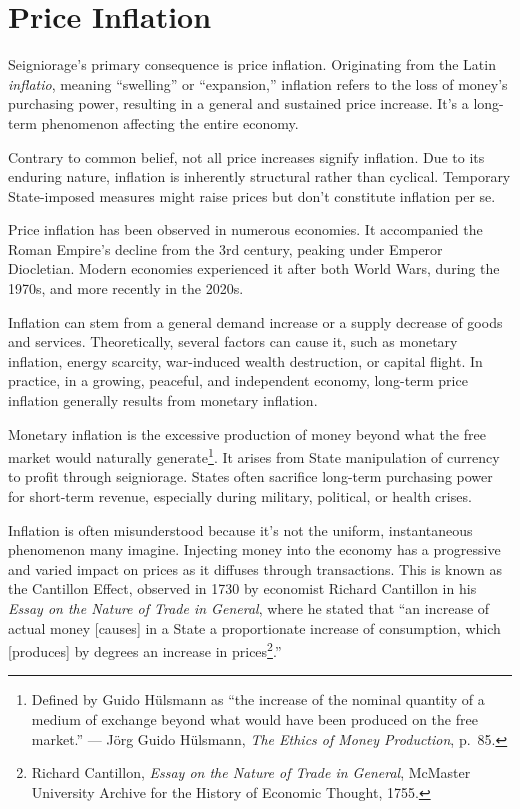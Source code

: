 \documentclass[
  a5paper,
  smalldemyvopaper,10pt,twoside,onecolumn,openright,extrafontsizes,hidelinks]{memoir}
\begin{document}
\section*{Price Inflation}\label{linflation-des-prix}


Seigniorage's primary consequence is price inflation. Originating from
the Latin \emph{inflatio}, meaning ``swelling'' or ``expansion,''
inflation refers to the loss of money's purchasing power, resulting in a
general and sustained price increase. It's a long-term phenomenon
affecting the entire economy.

Contrary to common belief, not all price increases signify inflation.
Due to its enduring nature, inflation is inherently structural rather
than cyclical. Temporary State-imposed measures might raise prices but
don't constitute inflation per se.

Price inflation has been observed in numerous economies. It accompanied
the Roman Empire's decline from the 3rd century, peaking under Emperor
Diocletian. Modern economies experienced it after both World Wars,
during the 1970s, and more recently in the 2020s.

Inflation can stem from a general demand increase or a supply decrease
of goods and services. Theoretically, several factors can cause it, such
as monetary inflation, energy scarcity, war-induced wealth destruction,
or capital flight. In practice, in a growing, peaceful, and independent
economy, long-term price inflation generally results from monetary
inflation.

Monetary inflation is the excessive production of money beyond what the
free market would naturally generate\footnote{Defined by Guido Hülsmann
  as ``the increase of the nominal quantity of a medium of exchange
  beyond what would have been produced on the free market.'' --- Jörg
  Guido Hülsmann, \emph{The Ethics of Money Production}, p.~85.}. It
arises from State manipulation of currency to profit through
seigniorage. States often sacrifice long-term purchasing power for
short-term revenue, especially during military, political, or health
crises.

Inflation is often misunderstood because it's not the uniform,
instantaneous phenomenon many imagine. Injecting money into the economy
has a progressive and varied impact on prices as it diffuses through
transactions. This is known as the Cantillon Effect, observed in 1730 by
economist Richard Cantillon in his \emph{Essay on the Nature of Trade in
General}, where he stated that ``an increase of actual money
{[}causes{]} in a State a proportionate increase of consumption, which
{[}produces{]} by degrees an increase in prices\footnote{Richard
  Cantillon, \emph{Essay on the Nature of Trade in General}, McMaster
  University Archive for the History of Economic Thought, 1755.}.''
\end{document}
